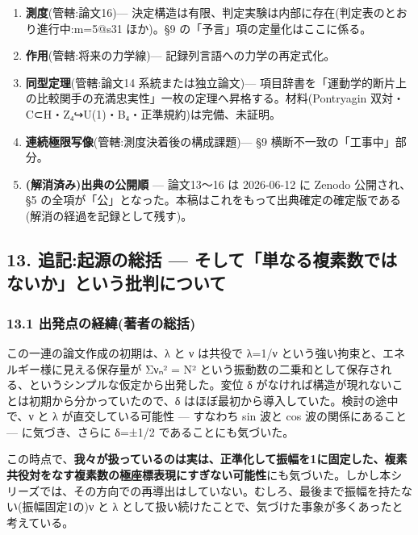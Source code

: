\documentclass[
]{ltjsarticle}
\providecommand{\tightlist}{%
  \setlength{\itemsep}{0pt}\setlength{\parskip}{0pt}}
\begin{document}
\begin{enumerate}
\def\labelenumi{\arabic{enumi}.}
\tightlist
\item
  \textbf{測度}(管轄:論文16)---
  決定構造は有限、判定実験は内部に存在(判定表のとおり進行中:m=5@s31
  ほか)。§9 の「予言」項の定量化はここに係る。
\item
  \textbf{作用}(管轄:将来の力学線)--- 記録列言語への力学の再定式化。
\item
  \textbf{同型定理}(管轄:論文14 系統または独立論文)---
  項目辞書を「運動学的断片上の比較関手の充満忠実性」一枚の定理へ昇格する。材料(Pontryagin
  双対・C⊂H・Z₄↪U(1)・B₄・正準規約)は完備、未証明。
\item
  \textbf{連続極限写像}(管轄:測度決着後の構成課題)--- §9
  横断不一致の「工事中」部分。
\item
  \textbf{(解消済み)出典の公開順} --- 論文13〜16 は 2026-06-12 に Zenodo
  公開され、§5
  の全項が「公」となった。本稿はこれをもって出典確定の確定版である(解消の経過を記録として残す)。
\end{enumerate}

\subsection{13. 追記:起源の総括 ---
そして「単なる複素数ではないか」という批判について}\label{ux8ffdux8a18ux8d77ux6e90ux306eux7dcfux62ec-ux305dux3057ux3066ux5358ux306aux308bux8907ux7d20ux6570ux3067ux306fux306aux3044ux304bux3068ux3044ux3046ux6279ux5224ux306bux3064ux3044ux3066}

\subsubsection{13.1
出発点の経緯(著者の総括)}\label{ux51faux767aux70b9ux306eux7d4cux7defux8457ux8005ux306eux7dcfux62ec}

この一連の論文作成の初期は、λ と ν は共役で λ=1/ν
という強い拘束と、エネルギー様に見える保存量が Σνₙ² = N²
という振動数の二乗和として保存される、というシンプルな仮定から出発した。変位
δ がなければ構造が現れないことは初期から分かっていたので、δ
はほぼ最初から導入していた。検討の途中で、ν と λ が直交している可能性
--- すなわち sin 波と cos 波の関係にあること --- に気づき、さらに δ=±1/2
であることにも気づいた。

この時点で、\textbf{我々が扱っているのは実は、正準化して振幅を1に固定した、複素共役対をなす複素数の極座標表現にすぎない可能性}にも気づいた。しかし本シリーズでは、その方向での再導出はしていない。むしろ、最後まで振幅を持たない(振幅固定1の)ν
と λ として扱い続けたことで、気づけた事象が多くあったと考えている。
\end{document}
